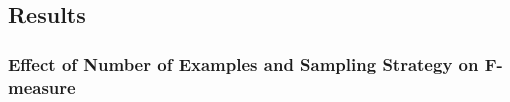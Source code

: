 
\subsection{Results}
\subsubsection{Effect of Number of Examples and Sampling Strategy on F-measure}

